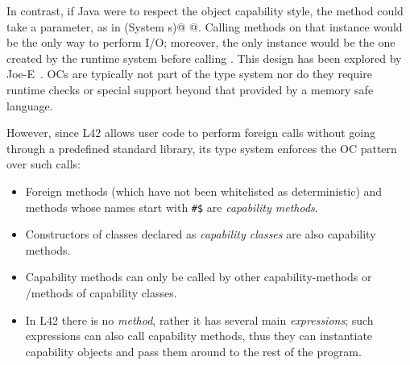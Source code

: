 In contrast, if Java were to respect the object capability style, the \Q@main@ method could take a \Q@System@ parameter, as in
 \Q@main(System s)@
 \lstset{language=Java}
@. \lstset{language=FortyTwo}%
Calling methods on that \Q@System@ instance would be the only way to perform I/O;
moreover, the only \Q@System@ instance would be the one created by the runtime system before calling \Q@main@. %
This design has been explored by Joe-E~\cite{finifter2008verifiable}.
OCs are typically not part of the type system nor do they require runtime checks or special support beyond that provided by a memory safe language. 

However, since
L42 allows user code to perform foreign calls without going through a predefined standard library, its type system enforces the OC pattern over such calls:
\SSI\begin{itemize}
\item Foreign methods (which have not been whitelisted as deterministic) and methods whose names start with \texttt{\#\$} are \emph{capability methods}.%
\item Constructors of classes declared as \emph{capability classes} are also capability methods.
\item Capability methods can only be called by other capability-methods or \Q@mut@/\Q@capsule@ methods of capability classes.
\item In L42 there is no \Q@main@ \emph{method}, rather it has several main \emph{expressions}; such expressions can also call capability methods, thus they can instantiate capability objects and pass them around to the rest of the program.

\end{itemize}

